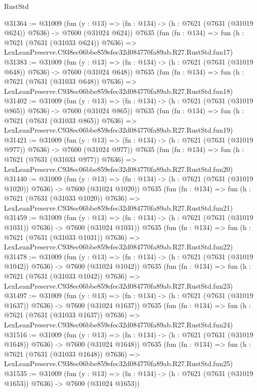 \begin{lexlean}{RustStd}
\begin{coremodule}
@31364 := @31009
    (fun (y : @13) => (fn : @134) -> (h : @7621 (@7631 (@31019 @624)) @7636) -> @7600 (@31024 @624))
    @7635
    (fun (fn : @134) =>
    fun (h : @7621 (@7631 (@31033 @624)) @7636) =>
    LexLeanPreserve.C938ec06bbe859efec32d084770fa89ab.R27.RustStd.fun17)
@31383 := @31009
    (fun (y : @13) => (fn : @134) -> (h : @7621 (@7631 (@31019 @648)) @7636) -> @7600 (@31024 @648))
    @7635
    (fun (fn : @134) =>
    fun (h : @7621 (@7631 (@31033 @648)) @7636) =>
    LexLeanPreserve.C938ec06bbe859efec32d084770fa89ab.R27.RustStd.fun18)
@31402 := @31009
    (fun (y : @13) => (fn : @134) -> (h : @7621 (@7631 (@31019 @865)) @7636) -> @7600 (@31024 @865))
    @7635
    (fun (fn : @134) =>
    fun (h : @7621 (@7631 (@31033 @865)) @7636) =>
    LexLeanPreserve.C938ec06bbe859efec32d084770fa89ab.R27.RustStd.fun19)
@31421 := @31009
    (fun (y : @13) => (fn : @134) -> (h : @7621 (@7631 (@31019 @977)) @7636) -> @7600 (@31024 @977))
    @7635
    (fun (fn : @134) =>
    fun (h : @7621 (@7631 (@31033 @977)) @7636) =>
    LexLeanPreserve.C938ec06bbe859efec32d084770fa89ab.R27.RustStd.fun20)
@31440 := @31009
    (fun (y : @13) =>
    (fn : @134) -> (h : @7621 (@7631 (@31019 @1020)) @7636) -> @7600 (@31024 @1020))
    @7635
    (fun (fn : @134) =>
    fun (h : @7621 (@7631 (@31033 @1020)) @7636) =>
    LexLeanPreserve.C938ec06bbe859efec32d084770fa89ab.R27.RustStd.fun21)
@31459 := @31009
    (fun (y : @13) =>
    (fn : @134) -> (h : @7621 (@7631 (@31019 @1031)) @7636) -> @7600 (@31024 @1031))
    @7635
    (fun (fn : @134) =>
    fun (h : @7621 (@7631 (@31033 @1031)) @7636) =>
    LexLeanPreserve.C938ec06bbe859efec32d084770fa89ab.R27.RustStd.fun22)
@31478 := @31009
    (fun (y : @13) =>
    (fn : @134) -> (h : @7621 (@7631 (@31019 @1042)) @7636) -> @7600 (@31024 @1042))
    @7635
    (fun (fn : @134) =>
    fun (h : @7621 (@7631 (@31033 @1042)) @7636) =>
    LexLeanPreserve.C938ec06bbe859efec32d084770fa89ab.R27.RustStd.fun23)
@31497 := @31009
    (fun (y : @13) =>
    (fn : @134) -> (h : @7621 (@7631 (@31019 @1637)) @7636) -> @7600 (@31024 @1637))
    @7635
    (fun (fn : @134) =>
    fun (h : @7621 (@7631 (@31033 @1637)) @7636) =>
    LexLeanPreserve.C938ec06bbe859efec32d084770fa89ab.R27.RustStd.fun24)
@31516 := @31009
    (fun (y : @13) =>
    (fn : @134) -> (h : @7621 (@7631 (@31019 @1648)) @7636) -> @7600 (@31024 @1648))
    @7635
    (fun (fn : @134) =>
    fun (h : @7621 (@7631 (@31033 @1648)) @7636) =>
    LexLeanPreserve.C938ec06bbe859efec32d084770fa89ab.R27.RustStd.fun25)
@31535 := @31009
    (fun (y : @13) =>
    (fn : @134) -> (h : @7621 (@7631 (@31019 @1653)) @7636) -> @7600 (@31024 @1653))

\end{coremodule}
\end{lexlean}
